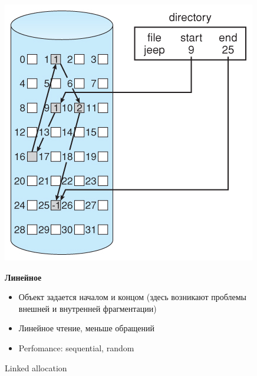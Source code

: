 \documentclass[../../lectures.tex]{subfiles}
\begin{document}
\begin{figure}[H]
\begin{minipage}[c]{0.47\linewidth}
\centering
\includegraphics[width=\textwidth]{images/linked-allocation.jpg}
\caption{Linked allocation}
\end{minipage}
\hspace{0.5cm}
\begin{minipage}[c]{0.5\linewidth}
\centering
\textbf{Линейное}
\begin{itemize}
    \item Объект задается началом и концом (здесь возникают проблемы внешней и внутренней фрагментации)
    \item Линейное чтение, меньше обращений
    \item Perfomance: sequential, random
\end{itemize}
\end{minipage}
\end{figure}
\end{document}
